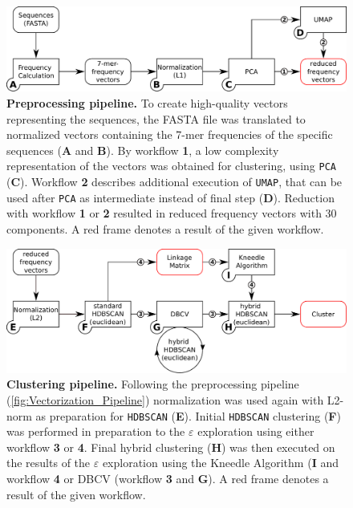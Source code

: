 \begin{figure}[!hbt]
    \centering
    \includegraphics[width=\textwidth]{Graphics/Vectorization.pdf}
    \caption[Preprocessing pipeline]{\textbf{Preprocessing pipeline.} To create high-quality vectors representing the sequences, the FASTA file was translated to normalized vectors containing the 7-mer frequencies of the specific sequences (\textsf{\textbf{A}} and \textsf{\textbf{B}}). By workflow \textsf{\textbf{1}}, a low complexity representation of the vectors was obtained for clustering, using \texttt{PCA} (\textsf{\textbf{C}}). Workflow \textsf{\textbf{2}} describes additional execution of \texttt{UMAP}, that can be used after \texttt{PCA} as intermediate instead of final step (\textsf{\textbf{D}}). Reduction with workflow \textsf{\textbf{1}} or \textsf{\textbf{2}} resulted in reduced frequency vectors with 30 components. A red frame denotes a result of the given workflow.} 
    \label{fig:Vectorization_Pipeline}
\end{figure}

\begin{figure}[!hbt]
    \centering
    \includegraphics[width=\textwidth]{Graphics/Clustering.pdf}
    \caption[Clustering pipeline]{\textbf{Clustering pipeline.} Following the preprocessing pipeline (\autoref{fig:Vectorization_Pipeline}) normalization was used again with L2-norm as preparation for \texttt{HDBSCAN} (\textsf{\textbf{E}}). Initial \texttt{HDBSCAN} clustering (\textsf{\textbf{F}}) was performed in preparation to the $\varepsilon$ exploration using either workflow \textsf{\textbf{3}} or \textsf{\textbf{4}}. Final hybrid clustering (\textsf{\textbf{H}}) was then executed on the results of the $\varepsilon$ exploration using the Kneedle Algorithm (\textsf{\textbf{I}} and workflow \textsf{\textbf{4}} or DBCV (workflow \textsf{\textbf{3}} and \textsf{\textbf{G}}). A red frame denotes a result of the given workflow.}
    \label{fig:Clustering_Pipeline}
\end{figure}

